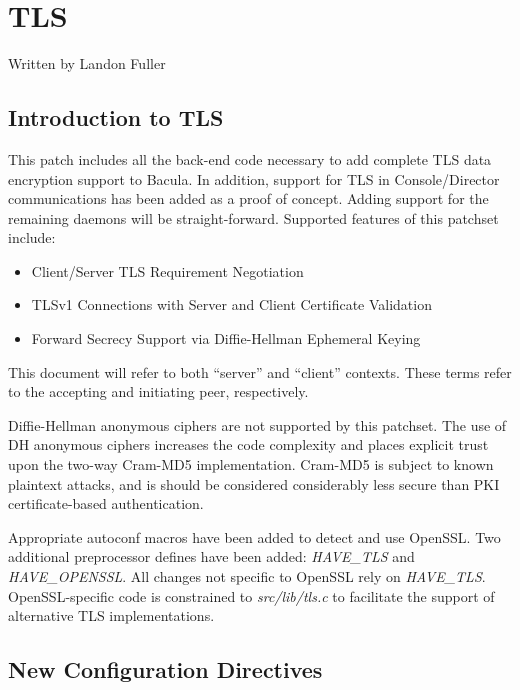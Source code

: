 

\chapter{TLS}
\label{_Chapter_TLS}

Written by Landon Fuller

\section{Introduction to TLS}

This patch includes all the back-end code necessary to add complete TLS
data encryption support to Bacula.  In addition, support for TLS in
Console/Director communications has been added as a proof of concept.
Adding support for the remaining daemons will be straight-forward.
Supported features of this patchset include:

\begin{itemize}
\item Client/Server TLS Requirement Negotiation
\item TLSv1 Connections with Server and Client Certificate
Validation
\item Forward Secrecy Support via Diffie-Hellman Ephemeral Keying
\end{itemize}

This document will refer to both ``server'' and ``client'' contexts.  These
terms refer to the accepting and initiating peer, respectively.

Diffie-Hellman anonymous ciphers are not supported by this patchset.  The
use of DH anonymous ciphers increases the code complexity and places
explicit trust upon the two-way Cram-MD5 implementation.  Cram-MD5 is
subject to known plaintext attacks, and is should be considered
considerably less secure than PKI certificate-based authentication.

Appropriate autoconf macros have been added to detect and use OpenSSL. Two
additional preprocessor defines have been added: \emph{HAVE\_TLS} and
\emph{HAVE\_OPENSSL}.  All changes not specific to OpenSSL rely on
\emph{HAVE\_TLS}.  OpenSSL-specific code is constrained to
\emph{src/lib/tls.c} to facilitate the support of alternative TLS
implementations.

\section{New Configuration Directives}

